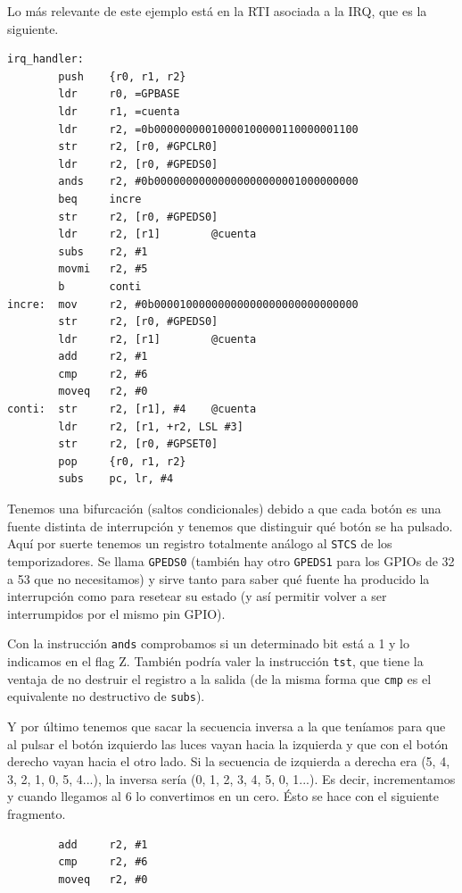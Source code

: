 Lo más relevante de este ejemplo está en la RTI asociada a la IRQ, que es la siguiente.

\begin{lstlisting}
irq_handler:
        push    {r0, r1, r2}
        ldr     r0, =GPBASE
        ldr     r1, =cuenta
        ldr     r2, =0b00000000010000100000110000001100
        str     r2, [r0, #GPCLR0]
        ldr     r2, [r0, #GPEDS0]
        ands    r2, #0b00000000000000000000001000000000
        beq     incre
        str     r2, [r0, #GPEDS0]
        ldr     r2, [r1]        @cuenta
        subs    r2, #1
        movmi   r2, #5
        b       conti
incre:  mov     r2, #0b00001000000000000000000000000000
        str     r2, [r0, #GPEDS0]
        ldr     r2, [r1]        @cuenta
        add     r2, #1
        cmp     r2, #6
        moveq   r2, #0
conti:  str     r2, [r1], #4    @cuenta
        ldr     r2, [r1, +r2, LSL #3]
        str     r2, [r0, #GPSET0]
        pop     {r0, r1, r2}
        subs    pc, lr, #4
\end{lstlisting}

Tenemos una bifurcación (saltos condicionales) debido a que cada botón es una fuente distinta
de interrupción y tenemos que distinguir qué botón se ha pulsado. Aquí por suerte tenemos
un registro totalmente análogo al {\tt STCS} de los temporizadores. Se llama {\tt GPEDS0}
(también hay otro {\tt GPEDS1} para los GPIOs de 32 a 53 que no necesitamos) y sirve tanto
para saber qué fuente ha producido la interrupción como para resetear su estado (y así permitir
volver a ser interrumpidos por el mismo pin GPIO).

Con la instrucción {\tt ands} comprobamos si un determinado bit está a 1 y lo indicamos en el
flag Z. También podría valer la instrucción {\tt tst}, que tiene la ventaja de no destruir
el registro a la salida (de la misma forma que {\tt cmp} es el equivalente no destructivo de
{\tt subs}).

Y por último tenemos que sacar la secuencia inversa a la que teníamos para que al pulsar el
botón izquierdo las luces vayan hacia la izquierda y que con el botón derecho vayan hacia
el otro lado. Si la secuencia de izquierda a derecha era  (5, 4, 3, 2, 1, 0, 5, 4...), la
inversa sería (0, 1, 2, 3, 4, 5, 0, 1...). Es decir, incrementamos y cuando llegamos al 6
lo convertimos en un cero. Ésto se hace con el siguiente fragmento.

\begin{lstlisting}
        add     r2, #1
        cmp     r2, #6
        moveq   r2, #0
\end{lstlisting}

